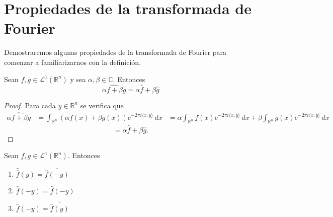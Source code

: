 \section{Propiedades de la transformada de Fourier}
Demostraremos algunas propiedades de la transformada de Fourier para comenzar a familiarizarnos con la definición.

\begin{proposicion}
    Sean $f,g \in \mathscr{L}^1(\mathbb{R}^n)$ y sea $\alpha,\beta \in \mathbb{C}$. Entonces
    \begin{equation}
         \widehat{\alpha f+\beta g} = \alpha \widehat{f} + \beta \widehat{g}
    \end{equation}
\end{proposicion}

\begin{proof}
Para cada $y \in \mathbb{R}^n$ se verifica que
\begin{equation}
\begin{aligned}
\widehat{ \alpha f+ \beta g} &= \int_{ \mathbb{R}^n}(\alpha f(x) + \beta g(x)) e^{-2\pi i \langle x, y \rangle} \, dx 
&= \alpha \int_{\mathbb{R}^n} f(x)e^{-2 \pi i \langle x, y \rangle} \, dx + \beta \int_{\mathbb{R}^n} g(x)e^{-2 \pi i \langle x, y \rangle} \, dx
\end{aligned}
\end{equation}
\begin{equation}
= \alpha \widehat{f} + \beta \widehat{g}.
\end{equation}
\end{proof}

\begin{proposicion}
Sean $f,g \in \mathscr{L}^1(\mathbb{R}^n)$. Entonces 

\begin{enumerate}
    \item $\widehat{\overline{f}}(y) = \overline{\widehat{f}(-y)}$
    \item $\widehat{f}(-y) = \widehat{f}(-y)$
    \item $\widehat{f}(-y) = \overline{\widehat{f}(y)}$
\end{enumerate}
\end{proposicion}

